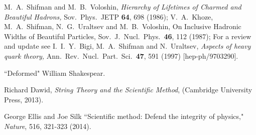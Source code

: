 \documentclass[epsfig,12pt]{article}
\begin{document}
\begin{thebibliography}{99}
{  
  M.~A.~Shifman and M.~B.~Voloshin,
{\em Hierarchy of Lifetimes of Charmed and Beautiful Hadrons,}
  Sov.\ Phys.\ JETP {\bf 64}, 698 (1986);
  V.~A.~Khoze, M.~A.~Shifman, N.~G.~Uraltsev and M.~B.~Voloshin,
{On Inclusive Hadronic Widths of Beautiful Particles,}
  Sov.\ J.\ Nucl.\ Phys.\  {\bf 46}, 112 (1987);
  For a review and update see 
   I.~I.~Y.~Bigi, M.~A.~Shifman and N.~Uraltsev,
  {\em Aspects of heavy quark theory,}
  Ann.\ Rev.\ Nucl.\ Part.\ Sci.\  {\bf 47}, 591 (1997)
  [hep-ph/9703290].
  


``Deformed" William Shakespear.

Richard Dawid, {\sl String Theory and the Scientific Method}, (Cambridge University Press, 2013).

George Ellis and Joe Silk ``Scientific method: Defend the integrity of physics," {\em Nature},  516, 321-323 (2014).

}

\end{thebibliography}
\end{document}
